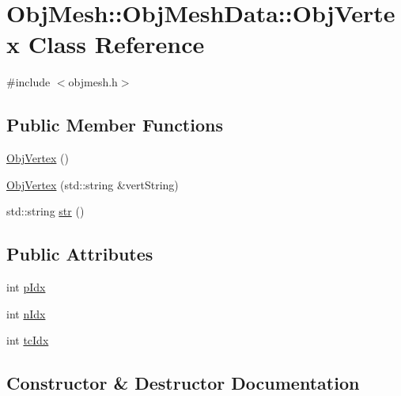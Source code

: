\hypertarget{class_obj_mesh_1_1_obj_mesh_data_1_1_obj_vertex}{}\section{Obj\+Mesh\+::Obj\+Mesh\+Data\+::Obj\+Vertex Class Reference}
\label{class_obj_mesh_1_1_obj_mesh_data_1_1_obj_vertex}


{\ttfamily \#include $<$objmesh.\+h$>$}

\subsection*{Public Member Functions}
\begin{DoxyCompactItemize}
\item 
\mbox{\hyperlink{class_obj_mesh_1_1_obj_mesh_data_1_1_obj_vertex_ac88ff10205069fa6b24e8651848239d5}{Obj\+Vertex}} ()
\item 
\mbox{\hyperlink{class_obj_mesh_1_1_obj_mesh_data_1_1_obj_vertex_aff511c764051fd83d3c42afde2c33946}{Obj\+Vertex}} (std\+::string \&vert\+String)
\item 
std\+::string \mbox{\hyperlink{class_obj_mesh_1_1_obj_mesh_data_1_1_obj_vertex_ab00ca548768642daf46d0e882259f268}{str}} ()
\end{DoxyCompactItemize}
\subsection*{Public Attributes}
\begin{DoxyCompactItemize}
\item 
int \mbox{\hyperlink{class_obj_mesh_1_1_obj_mesh_data_1_1_obj_vertex_a4186ae8c64f35269b5467904019fdee4}{p\+Idx}}
\item 
int \mbox{\hyperlink{class_obj_mesh_1_1_obj_mesh_data_1_1_obj_vertex_a6bcf57242213ff839e5665831de1ed97}{n\+Idx}}
\item 
int \mbox{\hyperlink{class_obj_mesh_1_1_obj_mesh_data_1_1_obj_vertex_aa2c29ace20cebc2afd7df01b9287de63}{tc\+Idx}}
\end{DoxyCompactItemize}


\subsection{Constructor \& Destructor Documentation}
\mbox{\label{class_obj_mesh_1_1_obj_mesh_data_1_1_obj_vertex_ac88ff10205069fa6b24e8651848239d5}} 

